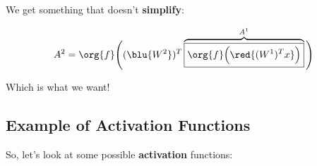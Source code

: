         We get something that doesn't \textbf{simplify}:
        
        \begin{equation}
            A^2 = 
            \org{f}
            \Bigg( 
                (\blu{W^2})^T 
                \overbrace{
                    \boxed{
                        \org{f}
                        \Big(
                            \red{ (W^1)^T x }
                        \Big)
                    }
                }^{A^1}
            \Bigg)
        \end{equation}
        
        Which is what we want!
        
    \subsection{Example of Activation Functions}
    
        So, let's look at some possible \textbf{activation} functions:
        
